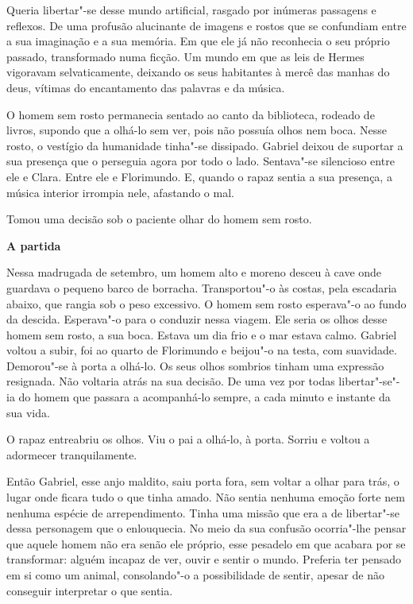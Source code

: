 Queria libertar"-se desse mundo artificial, rasgado por inúmeras
passagens e reflexos. De uma profusão alucinante de imagens e rostos que
se confundiam entre a sua imaginação e a sua memória. Em que ele já não
reconhecia o seu próprio passado, transformado numa ficção. Um mundo em
que as leis de Hermes vigoravam selvaticamente, deixando os seus
habitantes à mercê das manhas do deus, vítimas do encantamento das
palavras e da música.

O homem sem rosto permanecia sentado ao canto da biblioteca, rodeado de
livros, supondo que a olhá-lo sem ver, pois não possuía olhos nem boca.
Nesse rosto, o vestígio da humanidade tinha"-se dissipado. Gabriel deixou
de suportar a sua presença que o perseguia agora por todo o lado.
Sentava"-se silencioso entre ele e Clara. Entre ele e Florimundo. E,
quando o rapaz sentia a sua presença, a música interior irrompia nele,
afastando o mal.

Tomou uma decisão sob o paciente olhar do homem sem rosto.

\vspace*{1.8cm}
\noindent{}\textbf{A partida}

\bigskip

Nessa madrugada de setembro, um homem alto e moreno desceu à cave onde
guardava o pequeno barco de borracha. Transportou"-o às costas, pela
escadaria abaixo, que rangia sob o peso excessivo. O homem sem rosto
esperava"-o ao fundo da descida. Esperava"-o para o conduzir nessa viagem.
Ele seria os olhos desse homem sem rosto, a sua boca. Estava um dia frio
e o mar estava calmo. Gabriel voltou a subir, foi ao quarto de
Florimundo e beijou"-o na testa, com suavidade. Demorou"-se à porta a
olhá-lo. Os seus olhos sombrios tinham uma expressão resignada. Não
voltaria atrás na sua decisão. De uma vez por todas libertar"-se"-ia do
homem que passara a acompanhá-lo sempre, a cada minuto e instante da sua
vida.

O rapaz entreabriu os olhos. Viu o pai a olhá-lo, à porta. Sorriu e
voltou a adormecer tranquilamente.

Então Gabriel, esse anjo maldito, saiu porta fora, sem voltar a olhar
para trás, o lugar onde ficara tudo o que tinha amado. Não sentia
nenhuma emoção forte nem nenhuma espécie de arrependimento. Tinha uma
missão que era a de libertar"-se dessa personagem que o enlouquecia. No
meio da sua confusão ocorria"-lhe pensar que aquele homem não era senão
ele próprio, esse pesadelo em que acabara por se transformar: alguém
incapaz de ver, ouvir e sentir o mundo. Preferia ter pensado em si como
um animal, consolando"-o a possibilidade de sentir, apesar de não
conseguir interpretar o que sentia.

